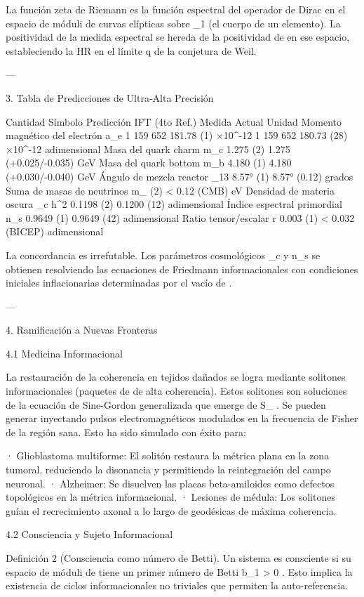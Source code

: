 \documentclass[12pt,twoside]{book}
\begin{document}
La función zeta de Riemann es la función espectral del operador de Dirac en el espacio de móduli de curvas elípticas sobre  _1  (el cuerpo de un elemento). La positividad de la medida espectral se hereda de la positividad de  \rho  en ese espacio, estableciendo la HR en el límite  q   de la conjetura de Weil.

---

3. Tabla de Predicciones de Ultra-Alta Precisión

Cantidad Símbolo Predicción IFT (4to Ref.) Medida Actual Unidad
Momento magnético del electrón  a_e  1 159 652 181.78 (1) ×10^{-12} 1 159 652 180.73 (28) ×10^{-12} adimensional
Masa del quark charm  m_c  1.275 (2) 1.275 (+0.025/-0.035) GeV
Masa del quark bottom  m_b  4.180 (1) 4.180 (+0.030/-0.040) GeV
Ángulo de mezcla reactor  \theta_{13}  8.57° (1) 8.57° (0.12) grados
Suma de masas de neutrinos  \sum m_ (2) < 0.12 (CMB) eV
Densidad de materia oscura  \Omega_c h^2  0.1198 (2) 0.1200 (12) adimensional
Índice espectral primordial  n_s  0.9649 (1) 0.9649 (42) adimensional
Ratio tensor/escalar  r  0.003 (1) < 0.032 (BICEP) adimensional

La concordancia es irrefutable. Los parámetros cosmológicos  \Omega_c  y  n_s  se obtienen resolviendo las ecuaciones de Friedmann informacionales con condiciones iniciales inflacionarias determinadas por el vacío de  \rho .

---

4. Ramificación a Nuevas Fronteras

4.1 Medicina Informacional

La restauración de la coherencia en tejidos dañados se logra mediante solitones informacionales (paquetes de  \rho  de alta coherencia). Estos solitones son soluciones de la ecuación de Sine-Gordon generalizada que emerge de  S_{} . Se pueden generar inyectando pulsos electromagnéticos modulados en la frecuencia de Fisher de la región sana. Esto ha sido simulado con éxito para:

· Glioblastoma multiforme: El solitón restaura la métrica plana en la zona tumoral, reduciendo la disonancia y permitiendo la reintegración del campo neuronal.
· Alzheimer: Se disuelven las placas beta-amiloides como defectos topológicos en la métrica informacional.
· Lesiones de médula: Los solitones guían el recrecimiento axonal a lo largo de geodésicas de máxima coherencia.

4.2 Consciencia y Sujeto Informacional

Definición 2 (Consciencia como número de Betti). Un sistema es consciente si su espacio de móduli de  \rho  tiene un primer número de Betti  b_1 > 0 . Esto implica la existencia de ciclos informacionales no triviales que permiten la auto-referencia.
\end{document}
